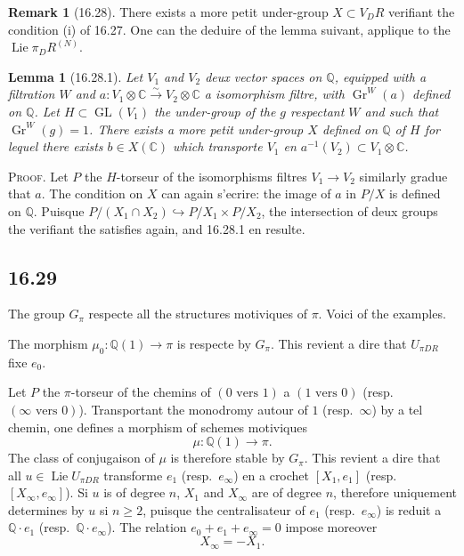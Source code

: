 \documentclass[12pt,a4paper]{article}
\theoremstyle{plain}
\newtheorem{lemma}[theorem]{Lemma}
\theoremstyle{definition}
\newtheorem{remark}[theorem]{Remark}
\theoremstyle{remark}
\DeclareMathOperator{\Lie}{Lie}
\DeclareMathOperator{\GL}{GL}
\DeclareMathOperator{\Gr}{Gr}
\newcommand{\dR}{DR}
\newcommand{\QQ}{\mathbb{Q}}
\newcommand{\CC}{\mathbb{C}}
\begin{document}
\begin{remark}[16.28]
There exists a more petit under-group $X \subset V_\dR$ verifiant the
condition (i) of 16.27. One can the deduire of the lemma suivant,
applique to the $\Lie \pi_\dR^{(N)}$.

\begin{lemma}[16.28.1]\label{lem:16.28.1}
Let $V_1$ and $V_2$ deux vector spaces on $\QQ$, equipped with a
filtration $W$ and $a : V_1 \otimes \CC \xrightarrow{\sim} V_2 \otimes \CC$
a isomorphism filtre, with $\Gr^W(a)$ defined on $\QQ$. Let
$H \subset \GL(V_1)$ the under-group of the $g$ respectant $W$ and such that
$\Gr^W(g) = 1$. There exists a more petit under-group $X$ defined on
$\QQ$ of $H$ for lequel there exists $b \in X(\CC)$ which transporte $V_1$
en $a^{-1}(V_2) \subset V_1 \otimes \CC$.
\end{lemma}

\noindent \textsc{Proof.} Let $P$ the $H$-torseur of the isomorphisms
filtres $V_1 \to V_2$ similarly gradue that $a$. The condition on $X$
can again s'ecrire: the image of $a$ in $P/X$ is defined on
$\QQ$. Puisque $P/(X_1 \cap X_2) \hookrightarrow P/X_1 \times P/X_2$,
the intersection of deux groups the verifiant the satisfies again, and
16.28.1 en resulte.
\end{remark}

\subsection*{16.29}

The group $G_\pi$ respecte all the structures motiviques of $\pi$.
Voici of the examples.

The morphism $\mu_0 : \QQ(1) \to \pi$ is respecte by $G_\pi$. This
revient a dire that $U_{\pi\dR}$ fixe $e_0$.

Let $P$ the $\pi$-torseur of the chemins of $(0 \text{ vers } 1)$ a
$(1 \text{ vers } 0)$ (resp.\ $(\infty \text{ vers } 0)$). Transportant the
monodromy autour of $1$ (resp.\ $\infty$) by a tel chemin, one defines a morphism of schemes motiviques
\[
\mu : \QQ(1) \to \pi.
\]
The class of conjugaison of $\mu$ is therefore stable by $G_\pi$. This
revient a dire that all $u \in \Lie U_{\pi\dR}$ transforme $e_1$
(resp.\ $e_\infty$) en a crochet $[X_1, e_1]$ (resp.\ $[X_\infty,
e_\infty]$). Si $u$ is of degree $n$, $X_1$ and $X_\infty$ are of degree $n$, therefore uniquement determines by $u$ si $n \geq 2$, puisque
the centralisateur of $e_1$ (resp.\ $e_\infty$) is reduit a
$\QQ \cdot e_1$ (resp.\ $\QQ \cdot e_\infty$). The relation
$e_0+e_1+e_\infty=0$ impose moreover
\[
X_\infty = -X_1.
\]
\end{document}

